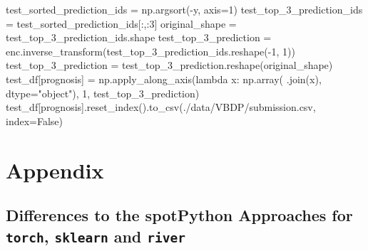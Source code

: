 \documentclass[
  letterpaper,
  DIV=11,
  numbers=noendperiod]{scrreprt}
\newenvironment{Shaded}{\begin{snugshade}}{\end{snugshade}}
\newcommand{\DecValTok}[1]{\textcolor[rgb]{0.68,0.00,0.00}{#1}}
\newcommand{\KeywordTok}[1]{\textcolor[rgb]{0.00,0.23,0.31}{#1}}
\newcommand{\NormalTok}[1]{\textcolor[rgb]{0.00,0.23,0.31}{#1}}
\newcommand{\OperatorTok}[1]{\textcolor[rgb]{0.37,0.37,0.37}{#1}}
\newcommand{\StringTok}[1]{\textcolor[rgb]{0.13,0.47,0.30}{#1}}
\newcommand{\VariableTok}[1]{\textcolor[rgb]{0.07,0.07,0.07}{#1}}
\begin{document}
\begin{Shaded}
\begin{Highlighting}[]
\NormalTok{test\_sorted\_prediction\_ids }\OperatorTok{=}\NormalTok{ np.argsort(}\OperatorTok{{-}}\NormalTok{y, axis}\OperatorTok{=}\DecValTok{1}\NormalTok{)}
\NormalTok{test\_top\_3\_prediction\_ids }\OperatorTok{=}\NormalTok{ test\_sorted\_prediction\_ids[:,:}\DecValTok{3}\NormalTok{]}
\NormalTok{original\_shape }\OperatorTok{=}\NormalTok{ test\_top\_3\_prediction\_ids.shape}
\NormalTok{test\_top\_3\_prediction }\OperatorTok{=}\NormalTok{ enc.inverse\_transform(test\_top\_3\_prediction\_ids.reshape(}\OperatorTok{{-}}\DecValTok{1}\NormalTok{, }\DecValTok{1}\NormalTok{))}
\NormalTok{test\_top\_3\_prediction }\OperatorTok{=}\NormalTok{ test\_top\_3\_prediction.reshape(original\_shape)}
\NormalTok{test\_df[}\StringTok{\textquotesingle{}prognosis\textquotesingle{}}\NormalTok{] }\OperatorTok{=}\NormalTok{ np.apply\_along\_axis(}\KeywordTok{lambda}\NormalTok{ x: np.array(}\StringTok{\textquotesingle{} \textquotesingle{}}\NormalTok{.join(x), dtype}\OperatorTok{=}\StringTok{"object"}\NormalTok{), }\DecValTok{1}\NormalTok{, test\_top\_3\_prediction)}
\NormalTok{test\_df[}\StringTok{\textquotesingle{}prognosis\textquotesingle{}}\NormalTok{].reset\_index().to\_csv(}\StringTok{\textquotesingle{}./data/VBDP/submission.csv\textquotesingle{}}\NormalTok{, index}\OperatorTok{=}\VariableTok{False}\NormalTok{)}
\end{Highlighting}
\end{Shaded}

\hypertarget{appendix}{%
\section{Appendix}\label{appendix}}

\hypertarget{differences-to-the-spotpython-approaches-for-torch-sklearn-and-river}{%
\subsection{\texorpdfstring{Differences to the spotPython Approaches for
\texttt{torch}, \texttt{sklearn} and
\texttt{river}}{Differences to the spotPython Approaches for torch, sklearn and river}}\label{differences-to-the-spotpython-approaches-for-torch-sklearn-and-river}}
\end{document}
